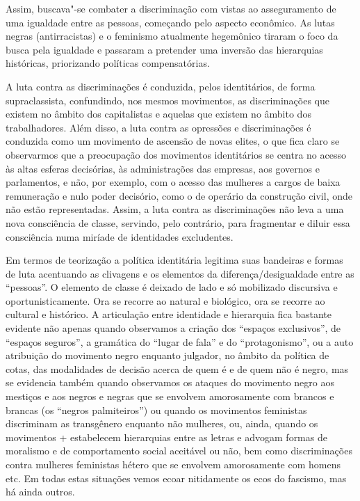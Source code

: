 Assim, buscava"-se combater a discriminação com vistas ao asseguramento
de uma igualdade entre as pessoas, começando pelo aspecto econômico. As
lutas negras (antirracistas) e o feminismo atualmente hegemônico tiraram
o foco da busca pela igualdade e passaram a pretender uma inversão das
hierarquias históricas, priorizando políticas compensatórias.

A luta contra as discriminações é conduzida, pelos identitários, de
forma supraclassista, confundindo, nos mesmos movimentos, as
discriminações que existem no âmbito dos capitalistas e aquelas que
existem no âmbito dos trabalhadores. Além disso, a luta contra as
opressões e discriminações é conduzida como um movimento de ascensão de
novas elites, o que fica claro se observarmos que a preocupação dos
movimentos identitários se centra no acesso às altas esferas decisórias,
às administrações das empresas, aos governos e parlamentos, e não, por
exemplo, com o acesso das mulheres a cargos de baixa remuneração e nulo
poder decisório, como o de operário da construção civil, onde não estão
representadas. Assim, a luta contra as discriminações não leva a uma
nova consciência de classe, servindo, pelo contrário, para fragmentar e
diluir essa consciência numa miríade de identidades excludentes.

Em termos de teorização a política identitária legitima suas bandeiras e
formas de luta acentuando as clivagens e os elementos da
diferença/desigualdade entre as ``pessoas''. O elemento de classe é
deixado de lado e só mobilizado discursiva e oportunisticamente. Ora se
recorre ao natural e biológico, ora se recorre ao cultural e histórico.
A articulação entre identidade e hierarquia fica bastante evidente não
apenas quando observamos a criação dos ``espaços exclusivos'', de
``espaços seguros'', a gramática do ``lugar de fala'' e do
``protagonismo'', ou a auto atribuição do movimento negro enquanto
julgador, no âmbito da política de cotas, das modalidades de decisão
acerca de quem é e de quem não é negro, mas se evidencia também quando
observamos os ataques do movimento negro aos mestiços e aos negros e
negras que se envolvem amorosamente com brancos e brancas (os ``negros
palmiteiros'') ou quando os movimentos feministas discriminam as
transgênero enquanto não mulheres, ou, ainda, quando os movimentos
+ estabelecem hierarquias entre as letras e advogam formas de
moralismo e de comportamento social aceitável ou não, bem como
discriminações contra mulheres feministas hétero que se envolvem
amorosamente com homens etc. Em todas estas situações vemos ecoar
nitidamente os ecos do fascismo, mas há ainda outros.

